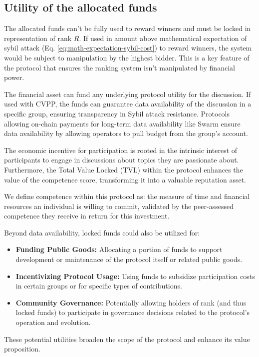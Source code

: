\documentclass{article}
\begin{document}
\begin{CJK}{UTF8}{gbsn}
    \subsection*{Utility of the allocated funds}
    The allocated funds can't be fully used to reward winners and must be locked in representation of rank $R$. If used in amount above mathematical expectation of sybil attack (Eq. \ref{eq:math-expectation-sybil-cost}) to reward winners, the system would be subject to manipulation by the highest bidder. This is a key feature of the protocol that ensures the ranking system isn't manipulated by financial power.

    The financial asset can fund any underlying protocol utility for the discussion. If used with CVPP\cite{cvpp}, the funds can guarantee data availability of the discussion in a specific group, ensuring transparency in Sybil attack resistance. Protocols allowing on-chain payments for long-term data availability like Swarm \cite{swarm} ensure data availability by allowing operators to pull budget from the group's account.

    The economic incentive for participation is rooted in the intrinsic interest of participants to engage in discussions about topics they are passionate about. Furthermore, the Total Value Locked (TVL) within the protocol enhances the value of the competence score, transforming it into a valuable reputation asset.

    We define competence within this protocol as: the measure of time and financial resources an individual is willing to commit, validated by the peer-assessed competence they receive in return for this investment.

        {{ Beyond data availability, locked funds could also be utilized for: }}
    \begin{itemize}
        \item \textbf{Funding Public Goods:}  Allocating a portion of funds to support development or maintenance of the protocol itself or related public goods.
        \item \textbf{Incentivizing Protocol Usage:}  Using funds to subsidize participation costs in certain groups or for specific types of contributions.
        \item \textbf{Community Governance:}  Potentially allowing holders of rank (and thus locked funds) to participate in governance decisions related to the protocol's operation and evolution.
    \end{itemize}
    {{ These potential utilities broaden the scope of the protocol and enhance its value proposition. }}


\end{CJK}
\end{document}
